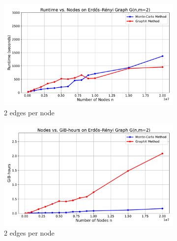 
\begin{figure}[H]
    \centering
    \begin{subfigure}[t]{0.47\linewidth}
        \centering
        \includegraphics[width=\linewidth]{images/plots/ER_2edg/runtime_vs_nodes_er_graph_2_edges.pdf}
        \caption{2 edges per node}
        \label{fig:2run}
    \end{subfigure}\hfill
    \begin{subfigure}[t]{0.47\linewidth}
        \centering
        \includegraphics[width=\linewidth]{images/plots/ER_2edg/gbhrs_nodes_er_graph_2edges.pdf}
        \caption{2 edges per node}
        \label{fig:2cost}
    \end{subfigure}
    \begin{subfigure}[t]{0.47\linewidth}

\end{subfigure}
\end{figure}
